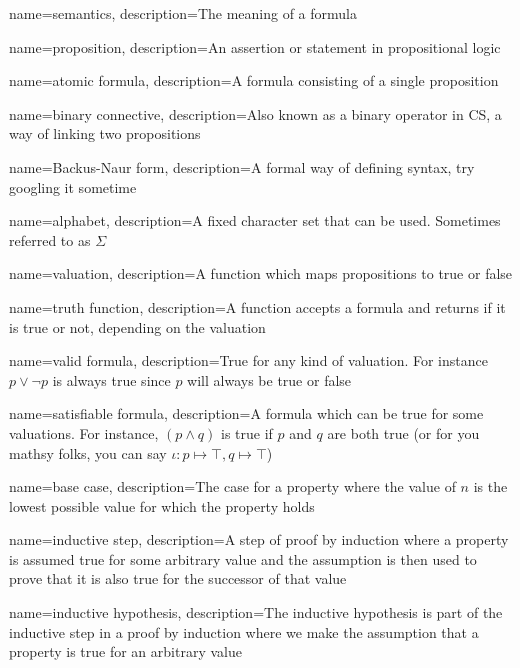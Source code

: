 {
    name={semantics},
    description={The meaning of a formula}
}

{
    name={proposition},
    description={An assertion or statement in propositional logic}
}

{
    name={atomic formula},
    description={A formula consisting of a single proposition}
}

{
    name={binary connective},
    description={Also known as a binary operator in CS, a way of linking two propositions}
}

{
    name={Backus-Naur form},
    description={A formal way of defining syntax, try googling it sometime}
}

{
    name={alphabet},
    description={A fixed character set that can be used. Sometimes referred to as $\Sigma$}
}

{
    name={valuation},
    description={A function which maps propositions to true or false}
}

{
    name={truth function},
    description={A function accepts a formula and returns if it is true or not, depending on the valuation}
}

{
    name={valid formula},
    description={True for any kind of valuation. For instance $p \lor \neg p$ is always true since $p$ will always be true or false}
}

{
    name={satisfiable formula},
    description={A formula which can be true for some valuations. For instance, $(p \land q)$ is true if $p$ and $q$ are both true (or for you mathsy folks, you can say $\iota: p \mapsto \top, q \mapsto \top$)}
}

{
    name={base case},
    description={The case for a property where the value of $n$ is the lowest possible value for which the property holds}
}

{
    name={inductive step},
    description={A step of proof by induction where a property is assumed true for some arbitrary value and the assumption is then used to prove that it is also true for the successor of that value}
}

{
    name={inductive hypothesis},
    description={The inductive hypothesis is part of the inductive step in a proof by induction where we make the assumption that a property is true for an arbitrary value}
}

